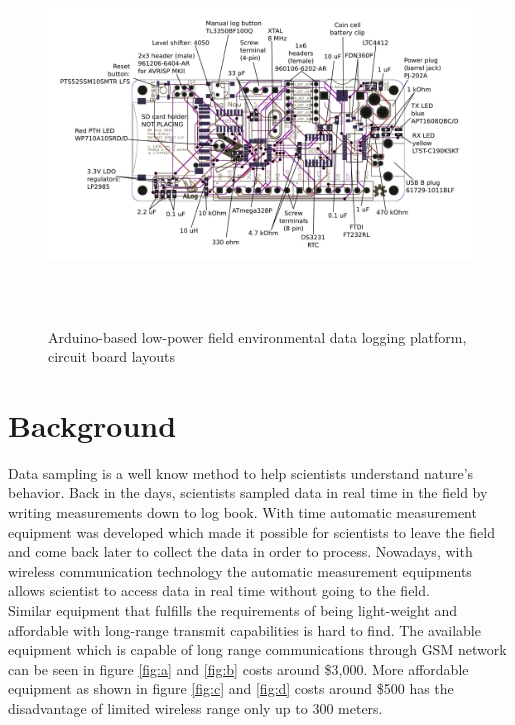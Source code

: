 \begin{figure}
\centering
\includegraphics[height=10cm]{graphics/ALog_drawing}
\caption{Arduino-based low-power field environmental data logging platform, circuit board layouts\label{fig:BottleLog}\cite{ALog-BottleLogger}}
\end{figure}

\section{Background}
Data sampling is a well know method to help scientists understand nature's behavior. Back in the days, scientists sampled data in real time in the field by writing measurements down to log book\cite{Weaterlog}. With time automatic measurement equipment was developed which made it possible for scientists to leave the field and come back later to collect the data in order to process. Nowadays, with wireless communication technology the automatic measurement equipments allows scientist to access data in real time without going to the field.\\
Similar equipment that fulfills the requirements of being light-weight and affordable with long-range transmit capabilities is hard to find. The available equipment which is capable of long range communications through GSM network can be seen in figure \ref{fig:a} and \ref{fig:b} costs around \$3,000. More affordable equipment as shown in figure \ref{fig:c} and  \ref{fig:d} costs around \$500 has the disadvantage of limited wireless range only up to 300 meters.


